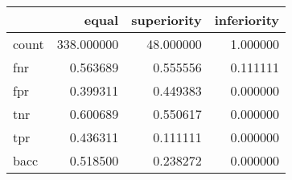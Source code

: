 \begin{tabular}{lrrr}
\toprule
{} &       equal &  superiority &  inferiority \\
\midrule
count &  338.000000 &    48.000000 &     1.000000 \\
fnr   &    0.563689 &     0.555556 &     0.111111 \\
fpr   &    0.399311 &     0.449383 &     0.000000 \\
tnr   &    0.600689 &     0.550617 &     0.000000 \\
tpr   &    0.436311 &     0.111111 &     0.000000 \\
bacc  &    0.518500 &     0.238272 &     0.000000 \\
\bottomrule
\end{tabular}
